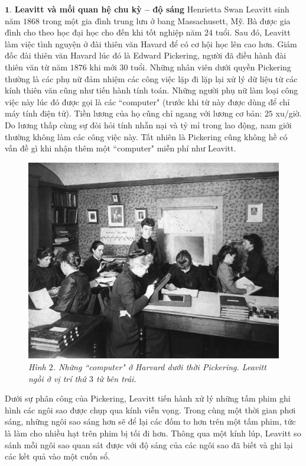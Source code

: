 \begin{multicols}{2}
	$\pmb{1.}$ \textbf{\color{timhieukhoahoc}Leavitt và mối quan hệ chu kỳ -- độ sáng}
	\vskip 0.1cm
	Henrietta Swan Leavitt sinh năm $1868$ trong một gia đình trung lưu ở bang Massachusett, Mỹ. Bà được gia đình cho theo học đại học cho đến khi tốt nghiệp năm $24$ tuổi. Sau đó, Leavitt làm việc tình nguyện ở đài thiên văn Havard để có cơ hội học lên cao hơn.
	\vskip 0.1cm
	Giám đốc đài thiên văn Havard lúc đó là Edward Pickering, người đã điều hành đài thiên văn từ năm $1876$ khi mới $30$ tuổi. Những nhân viên dưới quyền Pickering thường là các phụ nữ đảm nhiệm các công việc lặp đi lặp lại xử lý dữ liệu từ các kính thiên văn cũng như tiến hành tính toán. Những người phụ nữ làm loại công việc này lúc đó được gọi là các ``computer" (trước khi từ này được dùng để chỉ máy tính điện tử). Tiền lương của họ cũng chỉ ngang với lương cơ bản: $25$ xu/giờ. Do lương thấp cùng sự đòi hỏi tính nhẫn nại và tỷ mỉ trong lao động, nam giới thường không làm các công việc này. Tất nhiên là Pickering cũng không hề có vấn đề gì khi nhận thêm một ``computer" miễn phí như Leavitt. 
	\begin{figure}[H]
		\vspace*{-5pt}
		\centering
		\captionsetup{labelformat= empty, justification=centering}
		\includegraphics[width= 1\linewidth]{2}
		\caption{\small\textit{\color{timhieukhoahoc}Hình $2$. Những ``computer" ở Harvard dưới thời Pickering. Leavitt ngồi ở vị trí  thứ $3$ từ bên trái.}}
		\vspace*{-10pt}
	\end{figure}
	Dưới sự phân công của Pickering, Leavitt tiến hành xử lý những tấm phim ghi hình các ngôi sao được chụp qua kính viễn vọng. Trong cùng một thời gian phơi sáng, những ngôi sao sáng hơn sẽ để lại các đốm to hơn trên một tấm phim, tức là làm cho nhiều hạt trên phim bị tối đi hơn. Thông qua một kính lúp, Leavitt so sánh mỗi ngôi sao quan sát được với độ sáng của các ngôi sao đã biết và ghi lại các kết quả vào một cuốn sổ.

\end{multicols}
